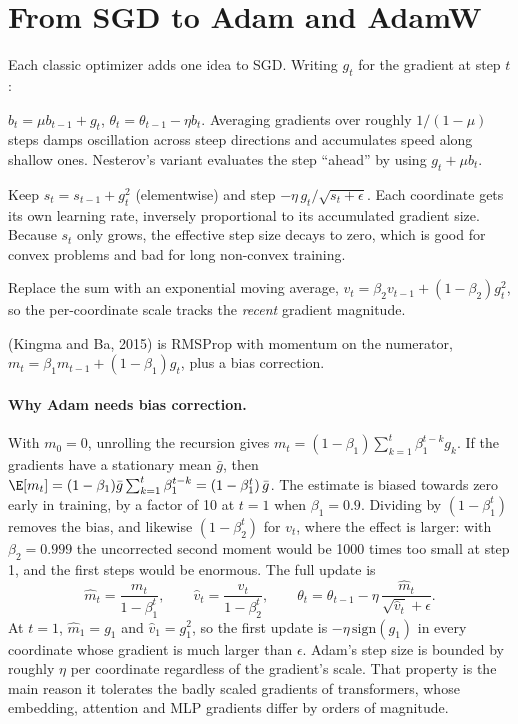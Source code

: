 \section{From SGD to Adam and AdamW}\label{sec:optim:adam}

Each classic optimizer adds one idea to SGD. Writing $g_t$ for the gradient at step $t$:

\begin{description}[leftmargin=1.2em, style=nextline]
  \item[Momentum.] $b_t = \mu b_{t-1} + g_t$, $\theta_t = \theta_{t-1} - \eta b_t$. Averaging
    gradients over roughly $1/(1-\mu)$ steps damps oscillation across steep directions and
    accumulates speed along shallow ones. Nesterov's variant evaluates the step ``ahead'' by using
    $g_t + \mu b_t$.
  \item[AdaGrad.] Keep $s_t = s_{t-1} + g_t^2$ (elementwise) and step
    $-\eta\, g_t/\sqrt{s_t+\epsilon}$. Each coordinate gets its own learning rate, inversely
    proportional to its accumulated gradient size. Because $s_t$ only grows, the effective step size
    decays to zero, which is good for convex problems and bad for long non-convex training.
  \item[RMSProp.] Replace the sum with an exponential moving average,
    $v_t = \beta_2 v_{t-1} + (1-\beta_2) g_t^2$, so the per-coordinate scale tracks the
    \emph{recent} gradient magnitude.
  \item[Adam] (Kingma and Ba, 2015) is RMSProp with momentum on the numerator,
    $m_t = \beta_1 m_{t-1} + (1-\beta_1) g_t$, plus a bias correction.
\end{description}

\paragraph{Why Adam needs bias correction.} With $m_0=0$, unrolling the recursion gives
$m_t = (1-\beta_1)\sum_{k=1}^{t}\beta_1^{t-k} g_k$. If the gradients have a stationary mean
$\bar g$, then $\E[m_t] = (1-\beta_1)\bar g \sum_{k=1}^{t}\beta_1^{t-k} = (1-\beta_1^t)\,\bar g$.
The estimate is biased towards zero early in training, by a factor of 10 at $t=1$ when
$\beta_1=0.9$. Dividing by $(1-\beta_1^t)$ removes the bias, and likewise $(1-\beta_2^t)$ for
$v_t$, where the effect is larger: with $\beta_2=0.999$ the uncorrected second moment would be
1000 times too small at step 1, and the first steps would be enormous. The full update is
\begin{equation}
\hat m_t = \frac{m_t}{1-\beta_1^t},\qquad \hat v_t = \frac{v_t}{1-\beta_2^t},\qquad
\theta_t = \theta_{t-1} - \eta\,\frac{\hat m_t}{\sqrt{\hat v_t}+\epsilon}.
\label{eq:optim:adam}
\end{equation}
At $t=1$, $\hat m_1 = g_1$ and $\hat v_1 = g_1^2$, so the first update is
$-\eta\,\mathrm{sign}(g_1)$ in every coordinate whose gradient is much larger than $\epsilon$.
Adam's step size is bounded by roughly $\eta$ per coordinate regardless of the gradient's scale.
That property is the main reason it tolerates the badly scaled gradients of transformers, whose
embedding, attention and MLP gradients differ by orders of magnitude.

